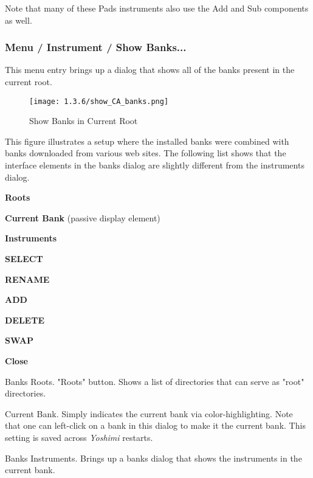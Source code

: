    Note that many of these Pads instruments also use the Add and Sub
   components as well.

\subsubsection{Menu / Instrument / Show Banks...}
\label{subsubsec:menu_instrument_show_banks}

   This menu entry brings up a dialog that shows all of the banks present in
   the current root.

\begin{figure}[H]
   \centering 
   \texttt{[image: 1.3.6/show\_CA\_banks.png]}
   \caption[Show Banks]{Show Banks in Current Root}
   \label{fig:show_ca_banks}
\end{figure}

   This figure illustrates a setup where the installed banks were combined with
   banks downloaded from various web sites.
   The following list shows that the interface elements in the banks dialog
   are slightly different from the instruments dialog.

   \begin{enumber}
      \item \textbf{Roots}
      \item \textbf{Current Bank} (passive display element)
      \item \textbf{Instruments}
      \item \textbf{SELECT}
      \item \textbf{RENAME}
      \item \textbf{ADD}
      \item \textbf{DELETE}
      \item \textbf{SWAP}
      \item \textbf{Close}
   \end{enumber}

   \setcounter{ItemCounter}{0}      %

   Banks Roots.
   "Roots" button.
   Shows a list of directories that can serve as "root" directories.

   Current Bank.  Simply indicates the current bank via color-highlighting.
   Note that one can left-click on a bank in this dialog to make it the
   current bank.  This setting is saved across \textsl{Yoshimi} restarts.

   Banks Instruments.
   Brings up a banks dialog that shows the instruments in the current bank.

